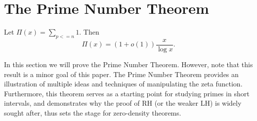 \section{The Prime Number Theorem}

\begin{theorem}
    Let $\Pi(x)=\sum_{p<=n} 1$. Then \[
        \Pi(x) = (1+o(1))\frac{x}{\log x}.
    \]
\end{theorem}

In this section we will prove the Prime Number Theorem.
However, note that this result is a minor goal of this paper.
The Prime Number Theorem provides an illustration of multiple ideas
and techniques of manipulating the zeta function.
Furthermore, this theorem serves as a starting point for
studying primes in short intervals, and demonstrates why the proof of
RH (or the weaker LH) is widely sought after, thus sets the stage for zero-density theorems.